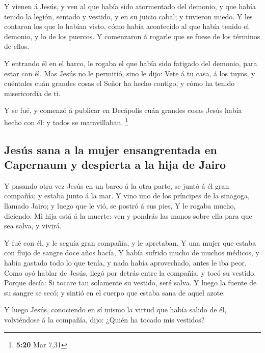  Y vienen á Jesús, y ven al que había sido atormentado
del demonio, y que había tenido la legión, sentado y vestido, y en su
juicio cabal; y tuvieron miedo.  Y les contaron los que
lo habían visto, cómo había acontecido al que había tenido el demonio, y
lo de los puercos.  Y comenzaron á rogarle que se fuese
de los términos de ellos.

 Y entrando él en el barco, le rogaba el que había sido
fatigado del demonio, para estar con él.  Mas Jesús no le
permitió, sino le dijo: Vete á tu casa, á los tuyos, y cuéntales cuán
grandes cosas el Señor ha hecho contigo, y cómo ha tenido misericordia
de ti.

 Y se fué, y comenzó á publicar en Decápolis cuán grandes
cosas Jesús había hecho con él: y todos se maravillaban. \footnote{\textbf{5:20}
  Mar 7,31}

\hypertarget{jesuxfas-sana-a-la-mujer-ensangrentada-en-capernaum-y-despierta-a-la-hija-de-jairo}{%
\subsection{Jesús sana a la mujer ensangrentada en Capernaum y despierta
a la hija de
Jairo}\label{jesuxfas-sana-a-la-mujer-ensangrentada-en-capernaum-y-despierta-a-la-hija-de-jairo}}

 Y pasando otra vez Jesús en un barco á la otra parte, se
juntó á él gran compañía; y estaba junto á la mar.  Y
vino uno de los príncipes de la sinagoga, llamado Jairo; y luego que le
vió, se postró á sus pies,  Y le rogaba mucho, diciendo:
Mi hija está á la muerte: ven y pondrás las manos sobre ella para que
sea salva, y vivirá.

 Y fué con él, y le seguía gran compañía, y le apretaban.
 Y una mujer que estaba con flujo de sangre doce años
hacía,  Y había sufrido mucho de muchos médicos, y había
gastado todo lo que tenía, y nada había aprovechado, antes le iba peor,
 Como oyó hablar de Jesús, llegó por detrás entre la
compañía, y tocó su vestido.  Porque decía: Si tocare tan
solamente su vestido, seré salva.  Y luego la fuente de
su sangre se secó; y sintió en el cuerpo que estaba sana de aquel azote.

 Y luego Jesús, conociendo en sí mismo la virtud que
había salido de él, volviéndose á la compañía, dijo: ¿Quién ha tocado
mis vestidos?

